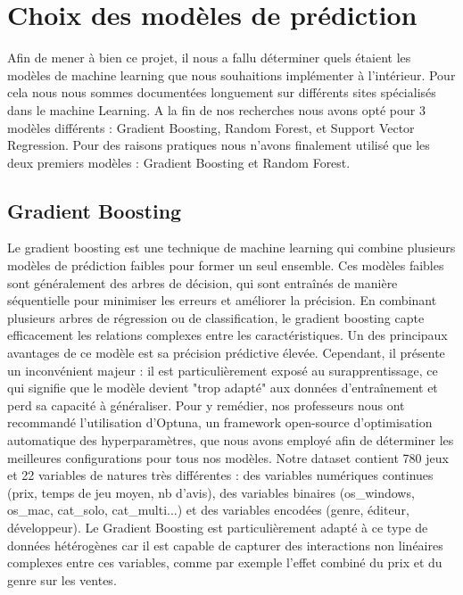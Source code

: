 \documentclass[mstat,12pt]{unswthesis}
\begin{document}
\hypertarget{ChoixDesModèlesDePrédiction}{%
\section{\textbf{Choix des modèles de prédiction}}\label{ChoixDesModèlesDePrédiction}}

Afin de mener à bien ce projet, il nous a fallu déterminer quels étaient les modèles de machine learning que nous souhaitions implémenter à l’intérieur. Pour cela nous nous sommes documentées longuement sur différents sites spécialisés dans le machine Learning. A la fin de nos recherches nous avons opté pour 3 modèles différents : Gradient Boosting, Random Forest, et Support Vector Regression. Pour des raisons pratiques nous n’avons finalement utilisé que les deux premiers modèles : Gradient Boosting et Random Forest. \\


\subsection{\textbf{Gradient Boosting}}

Le gradient boosting est une technique de machine learning qui combine plusieurs modèles de prédiction faibles pour former un seul ensemble. Ces modèles faibles sont généralement des arbres de décision, qui sont entraînés de manière séquentielle pour minimiser les erreurs et améliorer la précision. En combinant plusieurs arbres de régression ou de classification, le gradient boosting capte efficacement les relations complexes entre les caractéristiques. Un des principaux avantages de ce modèle est sa précision prédictive élevée. Cependant, il présente un inconvénient majeur : il est particulièrement exposé au surapprentissage, ce qui signifie que le modèle devient "trop adapté" aux données d'entraînement et perd sa capacité à généraliser. Pour y remédier, nos professeurs nous ont recommandé l'utilisation d'Optuna, un framework open-source d'optimisation automatique des hyperparamètres, que nous avons employé afin de déterminer les meilleures configurations pour tous nos modèles. Notre dataset contient 780 jeux et 22 variables de natures très différentes : des variables numériques continues (prix, temps de jeu moyen, nb d'avis), des variables binaires (os\_windows, os\_mac, cat\_solo, cat\_multi...) et des variables encodées (genre, éditeur, développeur). Le Gradient Boosting est particulièrement adapté à ce type de données hétérogènes car il est capable de capturer des interactions non linéaires complexes entre ces variables, comme par exemple l'effet combiné du prix et du genre sur les ventes.
\end{document}
